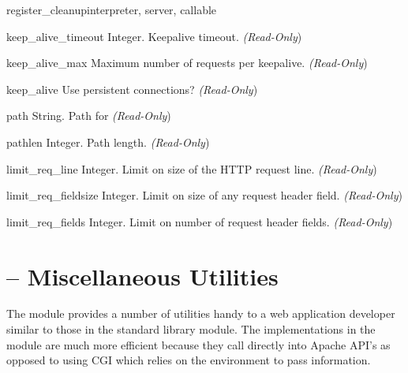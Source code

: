 \begin{funcdesc}{register_cleanup}{interpreter, server, callable}
\begin{memberdesc}[server]{keep_alive_timeout}
  Integer. Keepalive timeout.
  \emph{(Read-Only})
\end{memberdesc}

\begin{memberdesc}[server]{keep_alive_max}
  Maximum number of requests per keepalive.
  \emph{(Read-Only})
\end{memberdesc}

\begin{memberdesc}[server]{keep_alive}
  Use persistent connections?
  \emph{(Read-Only})
\end{memberdesc}

\begin{memberdesc}[server]{path}
  String. Path for 
  \emph{(Read-Only})
\end{memberdesc}

\begin{memberdesc}[server]{pathlen}
  Integer. Path length.
  \emph{(Read-Only})
\end{memberdesc}

\begin{memberdesc}[server]{limit_req_line}
  Integer. Limit on size of the HTTP request line.
  \emph{(Read-Only})
\end{memberdesc}

\begin{memberdesc}[server]{limit_req_fieldsize}
  Integer. Limit on size of any request header field.
  \emph{(Read-Only})
\end{memberdesc}

\begin{memberdesc}[server]{limit_req_fields}
  Integer. Limit on number of request header fields.
  \emph{(Read-Only})
\end{memberdesc}

\section{ -- Miscellaneous Utilities\label{pyapi-util}}

The  module provides a number of utilities handy to a web
application developer similar to those in the standard library
 module. The implementations in the  module
are much more efficient because they call directly into Apache API's
as opposed to using CGI which relies on the environment to pass
information.


\end{funcdesc}
